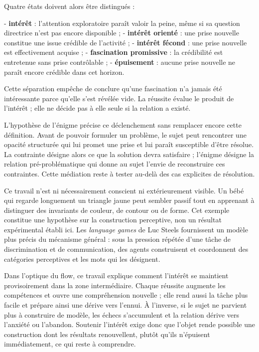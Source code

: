 \documentclass[10pt,a4paper]{article}
\begin{document}
Quatre états doivent alors être distingués :

- \textbf{intérêt} : l'attention exploratoire paraît valoir la peine, même si sa question   directrice n'est pas encore disponible ; - \textbf{intérêt orienté} : une prise nouvelle constitue une issue crédible de l'activité ; - \textbf{intérêt fécond} : une prise nouvelle est effectivement acquise ; - \textbf{fascination promissive} : la crédibilité est entretenue sans prise contrôlable ; - \textbf{épuisement} : aucune prise nouvelle ne paraît encore crédible dans cet horizon.

Cette séparation empêche de conclure qu'une fascination n'a jamais été intéressante parce qu'elle s'est révélée vide. La réussite évalue le produit de l'intérêt ; elle ne décide pas à elle seule si la relation a existé.

L'hypothèse de l'énigme précise ce déclenchement sans remplacer encore cette définition. Avant de pouvoir formuler un problème, le sujet peut rencontrer une opacité structurée qui lui promet une prise et lui paraît susceptible d'être résolue. La contrainte désigne alors ce que la solution devra satisfaire ; l'énigme désigne la relation pré-problématique qui donne au sujet l'envie de reconstruire ces contraintes. Cette médiation reste à tester au-delà des cas explicites de résolution.

Ce travail n'est ni nécessairement conscient ni extérieurement visible. Un bébé qui regarde longuement un triangle jaune peut sembler passif tout en apprenant à distinguer des invariants de couleur, de contour ou de forme. Cet exemple constitue une hypothèse sur la construction perceptive, non un résultat expérimental établi ici. Les \emph{language games} de Luc Steels fournissent un modèle plus précis du mécanisme général : sous la pression répétée d'une tâche de discrimination et de communication, des agents construisent et coordonnent des catégories perceptives et les mots qui les désignent.

Dans l'optique du flow, ce travail explique comment l'intérêt se maintient provisoirement dans la zone intermédiaire. Chaque réussite augmente les compétences et ouvre une compréhension nouvelle ; elle rend aussi la tâche plus facile et prépare ainsi une dérive vers l'ennui. À l'inverse, si le sujet ne parvient plus à construire de modèle, les échecs s'accumulent et la relation dérive vers l'anxiété ou l'abandon. Soutenir l'intérêt exige donc que l'objet rende possible une construction dont les résultats renouvellent, plutôt qu'ils n'épuisent immédiatement, ce qui reste à comprendre.
\end{document}
